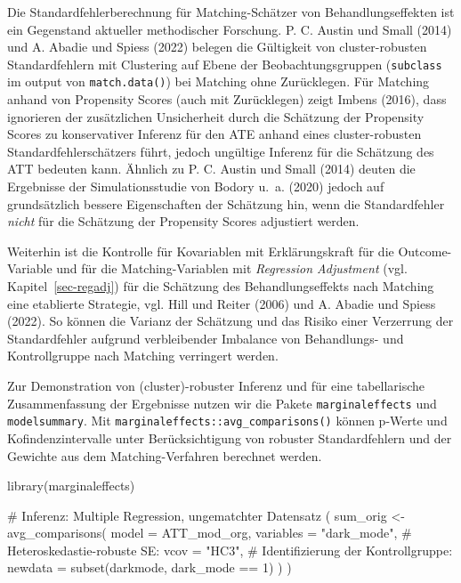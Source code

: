 \documentclass[
  a4paper,
  DIV=11,
  oneside]{scrreprt}
\newenvironment{Shaded}{\begin{snugshade}}{\end{snugshade}}
\newcommand{\AttributeTok}[1]{\textcolor[rgb]{0.40,0.45,0.13}{#1}}
\newcommand{\CommentTok}[1]{\textcolor[rgb]{0.37,0.37,0.37}{#1}}
\newcommand{\DecValTok}[1]{\textcolor[rgb]{0.68,0.00,0.00}{#1}}
\newcommand{\FunctionTok}[1]{\textcolor[rgb]{0.28,0.35,0.67}{#1}}
\newcommand{\NormalTok}[1]{\textcolor[rgb]{0.00,0.23,0.31}{#1}}
\newcommand{\OtherTok}[1]{\textcolor[rgb]{0.00,0.23,0.31}{#1}}
\newcommand{\SpecialCharTok}[1]{\textcolor[rgb]{0.37,0.37,0.37}{#1}}
\newcommand{\StringTok}[1]{\textcolor[rgb]{0.13,0.47,0.30}{#1}}
\begin{document}
Die Standardfehlerberechnung für Matching-Schätzer von
Behandlungseffekten ist ein Gegenstand aktueller methodischer Forschung.
P. C. Austin und Small (2014) und A. Abadie und Spiess (2022) belegen
die Gültigkeit von cluster-robusten Standardfehlern mit Clustering auf
Ebene der Beobachtungsgruppen (\texttt{subclass} im output von
\texttt{match.data()}) bei Matching ohne Zurücklegen. Für Matching
anhand von Propensity Scores (auch mit Zurücklegen) zeigt Imbens (2016),
dass ignorieren der zusätzlichen Unsicherheit durch die Schätzung der
Propensity Scores zu konservativer Inferenz für den ATE anhand eines
cluster-robusten Standardfehlerschätzers führt, jedoch ungültige
Inferenz für die Schätzung des ATT bedeuten kann. Ähnlich zu P. C.
Austin und Small (2014) deuten die Ergebnisse der Simulationsstudie von
Bodory u.~a. (2020) jedoch auf grundsätzlich bessere Eigenschaften der
Schätzung hin, wenn die Standardfehler \emph{nicht} für die Schätzung
der Propensity Scores adjustiert werden.

Weiterhin ist die Kontrolle für Kovariablen mit Erklärungskraft für die
Outcome-Variable und für die Matching-Variablen mit \emph{Regression
Adjustment} (vgl. Kapitel~\ref{sec-regadj}) für die Schätzung des
Behandlungseffekts nach Matching eine etablierte Strategie, vgl. Hill
und Reiter (2006) und A. Abadie und Spiess (2022). So können die Varianz
der Schätzung und das Risiko einer Verzerrung der Standardfehler
aufgrund verbleibender Imbalance von Behandlungs- und Kontrollgruppe
nach Matching verringert werden.

Zur Demonstration von (cluster)-robuster Inferenz und für eine
tabellarische Zusammenfassung der Ergebnisse nutzen wir die Pakete
\texttt{marginaleffects} und \texttt{modelsummary}. Mit
\texttt{marginaleffects::avg\_comparisons()} können p-Werte und
Kofindenzintervalle unter Berücksichtigung von robuster Standardfehlern
und der Gewichte aus dem Matching-Verfahren berechnet werden.

\begin{Shaded}
\begin{Highlighting}[]
\FunctionTok{library}\NormalTok{(marginaleffects)}

\CommentTok{\# Inferenz: Multiple Regression, ungematchter Datensatz}
\NormalTok{(}
\NormalTok{  sum\_orig }\OtherTok{\textless{}{-}} \FunctionTok{avg\_comparisons}\NormalTok{(}
    \AttributeTok{model =}\NormalTok{ ATT\_mod\_org,}
    \AttributeTok{variables =} \StringTok{"dark\_mode"}\NormalTok{,}
    \CommentTok{\# Heteroskedastie{-}robuste SE:}
    \AttributeTok{vcov =} \StringTok{"HC3"}\NormalTok{, }
    \CommentTok{\# Identifizierung der Kontrollgruppe:}
    \AttributeTok{newdata =} \FunctionTok{subset}\NormalTok{(darkmode, dark\_mode }\SpecialCharTok{==} \DecValTok{1}\NormalTok{) }
\NormalTok{  )}
\NormalTok{) }
\end{Highlighting}
\end{Shaded}
\end{document}
